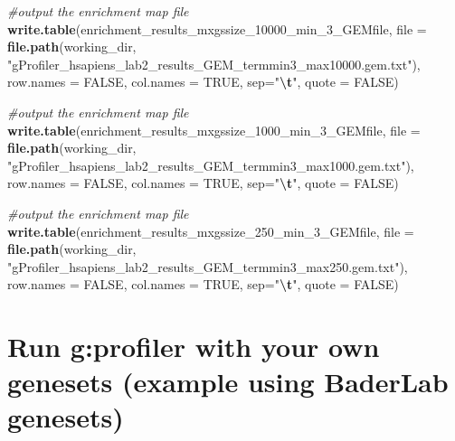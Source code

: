 \documentclass[
]{book}
\newenvironment{Shaded}{\begin{snugshade}}{\end{snugshade}}
\newcommand{\AttributeTok}[1]{\textcolor[rgb]{0.13,0.29,0.53}{#1}}
\newcommand{\CommentTok}[1]{\textcolor[rgb]{0.56,0.35,0.01}{\textit{#1}}}
\newcommand{\ConstantTok}[1]{\textcolor[rgb]{0.56,0.35,0.01}{#1}}
\newcommand{\FunctionTok}[1]{\textcolor[rgb]{0.13,0.29,0.53}{\textbf{#1}}}
\newcommand{\NormalTok}[1]{#1}
\newcommand{\SpecialCharTok}[1]{\textcolor[rgb]{0.81,0.36,0.00}{\textbf{#1}}}
\newcommand{\StringTok}[1]{\textcolor[rgb]{0.31,0.60,0.02}{#1}}
\begin{document}
\begin{Shaded}
\begin{Highlighting}[]
\CommentTok{\#output the enrichment map file}
\FunctionTok{write.table}\NormalTok{(enrichment\_results\_mxgssize\_10000\_min\_3\_GEMfile, }
            \AttributeTok{file =} \FunctionTok{file.path}\NormalTok{(working\_dir, }
                \StringTok{"gProfiler\_hsapiens\_lab2\_results\_GEM\_termmin3\_max10000.gem.txt"}\NormalTok{),}
            \AttributeTok{row.names =} \ConstantTok{FALSE}\NormalTok{, }
            \AttributeTok{col.names =} \ConstantTok{TRUE}\NormalTok{, }\AttributeTok{sep=}\StringTok{"}\SpecialCharTok{\textbackslash{}t}\StringTok{"}\NormalTok{,}
            \AttributeTok{quote =} \ConstantTok{FALSE}\NormalTok{)}

\CommentTok{\#output the enrichment map file}
\FunctionTok{write.table}\NormalTok{(enrichment\_results\_mxgssize\_1000\_min\_3\_GEMfile, }
            \AttributeTok{file =} \FunctionTok{file.path}\NormalTok{(working\_dir, }
                \StringTok{"gProfiler\_hsapiens\_lab2\_results\_GEM\_termmin3\_max1000.gem.txt"}\NormalTok{),}
            \AttributeTok{row.names =} \ConstantTok{FALSE}\NormalTok{, }
            \AttributeTok{col.names =} \ConstantTok{TRUE}\NormalTok{, }\AttributeTok{sep=}\StringTok{"}\SpecialCharTok{\textbackslash{}t}\StringTok{"}\NormalTok{,}
            \AttributeTok{quote =} \ConstantTok{FALSE}\NormalTok{)}

\CommentTok{\#output the enrichment map file}
\FunctionTok{write.table}\NormalTok{(enrichment\_results\_mxgssize\_250\_min\_3\_GEMfile, }
            \AttributeTok{file =} \FunctionTok{file.path}\NormalTok{(working\_dir, }
                \StringTok{"gProfiler\_hsapiens\_lab2\_results\_GEM\_termmin3\_max250.gem.txt"}\NormalTok{),}
            \AttributeTok{row.names =} \ConstantTok{FALSE}\NormalTok{, }
            \AttributeTok{col.names =} \ConstantTok{TRUE}\NormalTok{, }\AttributeTok{sep=}\StringTok{"}\SpecialCharTok{\textbackslash{}t}\StringTok{"}\NormalTok{,}
            \AttributeTok{quote =} \ConstantTok{FALSE}\NormalTok{)}
\end{Highlighting}
\end{Shaded}

\section{Run g:profiler with your own genesets (example using BaderLab genesets)}\label{run-gprofiler-with-your-own-genesets-example-using-baderlab-genesets}
\end{document}

